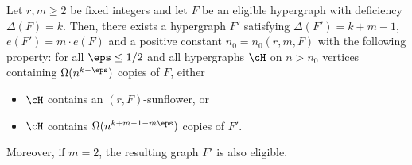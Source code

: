 \begin{lemma}\label{lemma:iteration step}
Let $r, m\geq 2$ be fixed integers and let $F$ be an eligible hypergraph with deficiency $\Delta(F)=k$. Then, there exists a hypergraph $F'$ satisfying $\Delta(F')=k+m-1$, $e(F')=m\cdot  e(F)$ and a positive constant $n_0=n_0(r,m,F)$ with the following property: for all $\eps\leq 1/2$ and all hypergraphs $\cH$ on $n>n_0$ vertices containing $\Omega(n^{k-\eps})$ copies of $F$, either
\begin{itemize}
    \item $\cH$ contains an $(r, F)$-sunflower, or
    \item $\cH$ contains $\Omega(n^{k+m-1-m\eps})$ copies of $F'$.
\end{itemize}
Moreover, if $m=2$, the resulting graph $F'$ is also eligible.
\end{lemma}
